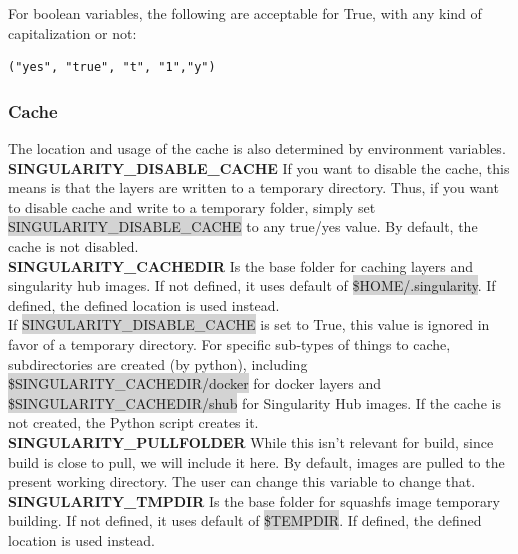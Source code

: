\documentclass[a4paper]{article}
\begin{document}
For boolean variables, the following are acceptable for True, with any kind of capitalization or not:

\begin{lstlisting}[frame=single]
("yes", "true", "t", "1","y")
\end{lstlisting}

\subsubsection{Cache}

The location and usage of the cache is also determined by environment variables.\\[0.1in]
\textbf{SINGULARITY\_DISABLE\_CACHE} If you want to disable the cache, this means is that the layers are written to a temporary directory. Thus, if you want to disable cache and write to a temporary folder, simply set  \colorbox{lightgray}{SINGULARITY\_DISABLE\_CACHE} to any true/yes value. By default, the cache is not disabled.\\[0.1in]

\textbf{SINGULARITY\_CACHEDIR} Is the base folder for caching layers and singularity hub images. If not defined, it uses default of  \colorbox{lightgray}{\$HOME/.singularity}. If defined, the defined location is used instead. \\If  \colorbox{lightgray}{SINGULARITY\_DISABLE\_CACHE} is set to True, this value is ignored in favor of a temporary directory. For specific sub-types of things to cache, subdirectories are created (by python), including  \colorbox{lightgray}{\$SINGULARITY\_CACHEDIR/docker} for docker layers and  \colorbox{lightgray}{\$SINGULARITY\_CACHEDIR/shub} for Singularity Hub images. If the cache is not created, the Python script creates it.\\[0.1in]

\textbf{SINGULARITY\_PULLFOLDER} While this isn’t relevant for build, since build is close to pull, we will include it here. By default, images are pulled to the present working directory. The user can change this variable to change that.\\[0.1in]

\textbf{SINGULARITY\_TMPDIR} Is the base folder for squashfs image temporary building. If not defined, it uses default of  \colorbox{lightgray}{\$TEMPDIR}. If defined, the defined location is used instead.\\[0.1in]
\end{document}
